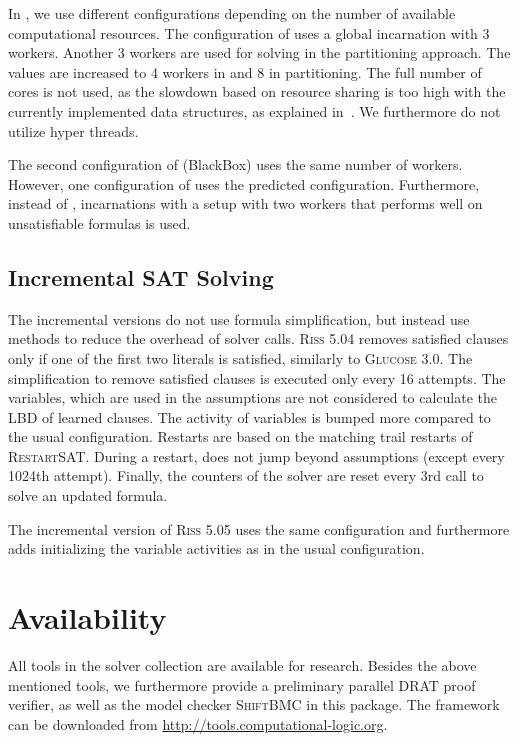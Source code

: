 \documentclass[conference]{IEEEtran}
\begin{document}
In \pcasso, we use different configurations depending on the number of available computational resources. 
The configuration of \pcasso uses a global \priss incarnation with $3$ workers. 
Another $3$ workers are used for solving in the partitioning approach. 
The values are increased to $4$ workers in \priss and $8$ in partitioning. 
The full number of cores is not used, as the slowdown based on resource sharing is too high with the currently implemented data structures, as explained in~\cite{?arminSharing}. 
We furthermore do not utilize hyper threads. 

The second configuration of \pcasso (BlackBox) uses the same number of workers. 
However, one configuration of \priss uses the predicted configuration. 
Furthermore, instead of \riss, \priss incarnations with a setup with two workers that performs well on unsatisfiable formulas is used. 

\subsection{Incremental SAT Solving}

The incremental versions do not use formula simplification, but instead use methods to reduce the overhead of solver calls. 
\textsc{Riss 5.04} removes satisfied clauses only if one of the first two literals is satisfied, similarly to \textsc{Glucose 3.0}. 
The simplification to remove satisfied clauses is executed only every 16 attempts. 
The variables, which are used in the assumptions are not considered to calculate the LBD of learned clauses. 
The activity of variables is bumped more compared to the usual configuration. 
Restarts are based on the matching trail restarts of \textsc{RestartSAT}. 
During a restart, \riss does not jump beyond assumptions (except every 1024th attempt). 
Finally, the counters of the solver are reset every $3$rd call to solve an updated formula. 

The incremental version of \textsc{Riss 5.05} uses the same configuration and furthermore adds initializing the variable activities as in the usual configuration. 

\section{Availability}

All tools in the solver collection are available for research. 
Besides the above mentioned tools, we furthermore provide a preliminary parallel DRAT proof verifier, as well as the model checker \textsc{ShiftBMC} in this package.
The framework can be downloaded from \url{http://tools.computational-logic.org}.
\end{document}
